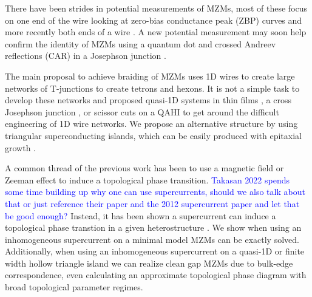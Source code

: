 \documentclass[aps,prb,showpacs,amsmath,amssymb,superscriptaddress]{revtex4-2}
\newcommand{\Blue}[1]{\textcolor{blue}{#1}}
\begin{document}
There have been strides in potential measurements of MZMs, most of these focus on one end of the wire \cite{mourikSignaturesMajoranaFermions2012, rokhinsonFractionalJosephsonEffect2012, dengAnomalousZeroBiasConductance2012, nadj-pergeObservationMajoranaFermions2014, xuExperimentalDetectionMajorana2015, albrechtExponentialProtectionZero2016, sunMajoranaZeroMode2016, wangEvidenceMajoranaBound2018, jackObservationMajoranaZero2019, fornieriEvidenceTopologicalSuperconductivity2019, renTopologicalSuperconductivityPhasecontrolled2019, mannaSignaturePairMajorana2020} looking at zero-bias conductance peak (ZBP) curves and more recently both ends of a wire \cite{schneiderPrecursorsMajoranaModes2022}.
A new potential measurement may soon help confirm the identity of MZMs using a quantum dot and crossed Andreev reflections (CAR) in a Josephson junction \cite{fengProbingRobustMajorana2022}.

The main proposal to achieve braiding of MZMs uses 1D wires to create large networks of T-junctions to create tetrons and hexons.
It is not a simple task to develop these networks \cite{karzigScalableDesignsQuasiparticlepoisoningprotected2017} and proposed quasi-1D systems in thin films \cite{potterMultichannelGeneralizationKitaev2010}, a cross Josephson junction \cite{zhouPhaseControlMajorana2020}, or scissor cuts on a QAHI \cite{xieCreatingLocalizedMajorana2021} to get around the difficult engineering of 1D wire networks.
We propose an alternative structure by using triangular superconducting islands, which can be easily produced with epitaxial growth \cite{pietzschSpinResolvedElectronicStructure2006}.

A common thread of the previous work has been to use a magnetic field or Zeeman effect to induce a topological phase transition.
\Blue{Takasan 2022 spends some time building up why one can use supercurrents, should we also talk about that or just reference their paper and the 2012 supercurrent paper and let that be good enough?}
Instead, it has been shown a supercurrent can induce a topological phase transtion in a given heterostructure \cite{romitoManipulatingMajoranaFermions2012, takasanSupercurrentinducedTopologicalPhase2022}.
We show when using an inhomogeneous supercurrent on a minimal model MZMs can be exactly solved.
Additionally, when using an inhomogeneous supercurrent on a quasi-1D or finite width hollow triangle island we can realize clean gap MZMs due to bulk-edge correspondence, even calculating an approximate topological phase diagram with broad topological parameter regimes.
\end{document}
